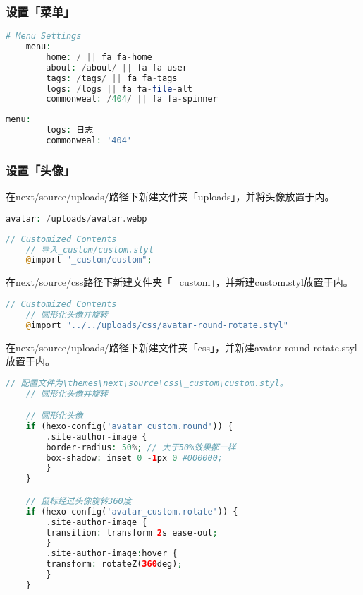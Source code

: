 \subsubsection{设置「菜单」}
\begin{lstlisting}[language={PHP},title={搜索主题Config.yml相关代码并修改}]
    # Menu Settings
    menu:
        home: / || fa fa-home
        about: /about/ || fa fa-user
        tags: /tags/ || fa fa-tags
        logs: /logs || fa fa-file-alt
        commonweal: /404/ || fa fa-spinner
\end{lstlisting}
\begin{lstlisting}[language={PHP},title={搜索next/languages/zh-CN.yml相关代码并修改}]
    menu:
        logs: 日志
        commonweal: '404'
\end{lstlisting}

\subsubsection{设置「头像」}
在next/source/uploads/路径下新建文件夹「uploads」，并将头像放置于内。
\begin{lstlisting}[language={PHP},title={搜索主题Config相关代码并修改}]
    avatar: /uploads/avatar.webp
\end{lstlisting}
\begin{lstlisting}[language={PHP},title={next/source/css/main.styl底部新增相关代码}]
    // Customized Contents
    // 导入_custom/custom.styl
    @import "_custom/custom";
\end{lstlisting}

在next/source/css路径下新建文件夹「\_custom」，并新建custom.styl放置于内。
\begin{lstlisting}[language={PHP},title={next/source/css/\_custom/custom.styl新增相关代码}]
    // Customized Contents
    // 圆形化头像并旋转
    @import "../../uploads/css/avatar-round-rotate.styl"
\end{lstlisting}

在next/source/uploads/路径下新建文件夹「css」，并新建avatar-round-rotate.styl放置于内。
\begin{lstlisting}[language={PHP},title={next/source/uploads/avatar-round-rotate.styl新增相关代码}]
    // 配置文件为\themes\next\source\css\_custom\custom.styl。
    // 圆形化头像并旋转

    // 圆形化头像
    if (hexo-config('avatar_custom.round')) {
        .site-author-image {
        border-radius: 50%; // 大于50%效果都一样
        box-shadow: inset 0 -1px 0 #000000;
        }
    }

    // 鼠标经过头像旋转360度
    if (hexo-config('avatar_custom.rotate')) {
        .site-author-image {
        transition: transform 2s ease-out;
        }
        .site-author-image:hover {
        transform: rotateZ(360deg);
        }
    }
\end{lstlisting}

